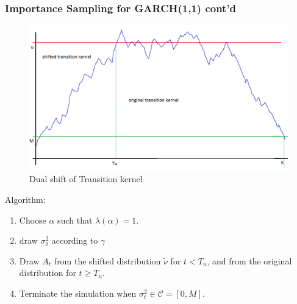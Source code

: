 \documentclass{beamer}
\begin{document}
\begin{frame}
  \frametitle{Importance Sampling for GARCH(1,1) cont'd}
  \begin{minipage}[t]{0.5\linewidth}
    \begin{figure}
      \centering
      \includegraphics[width=1.0\linewidth]{pic1.png}
      \caption{\footnotesize Dual shift of Transition kernel}
      \label{fig:dual_measure}
    \end{figure}
  \end{minipage}\hfill
  \begin{minipage}[t]{0.45\linewidth}
    \begin{small}
      Algorithm:
      \begin{enumerate}
      \item Choose $\alpha$ such that $\lambda(\alpha) = 1$.
      \item draw $\sigma_0^2$ according to $\gamma$
      \item Draw $A_t$ from the shifted distribution $\tilde \nu$ for $t < T_u$, and from
        the original distribution for $t \geq T_u$.
      \item Terminate the simulation when
        $\sigma_t^2 \in \mathcal C = [0, M]$.
      \end{enumerate}
    \end{small}
  \end{minipage}
\end{frame}
\end{document}
